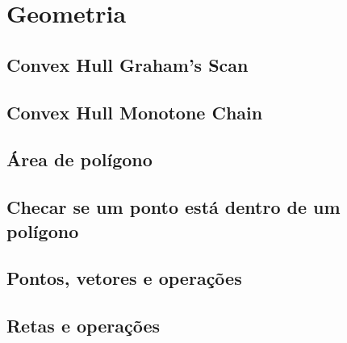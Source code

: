 \section{Geometria}

\subsection{Convex Hull Graham's Scan}


\subsection{Convex Hull Monotone Chain}


\subsection{Área de polígono}


\subsection{Checar se um ponto está dentro de um polígono}


\subsection{Pontos, vetores e operações}


\subsection{Retas e operações}
